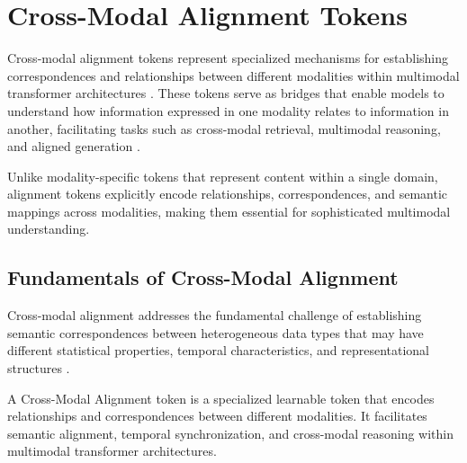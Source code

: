 
\section{Cross-Modal Alignment Tokens}

Cross-modal alignment tokens represent specialized mechanisms for establishing correspondences and relationships between different modalities within multimodal transformer architectures \citep{radford2021learning, li2022blip}. These tokens serve as bridges that enable models to understand how information expressed in one modality relates to information in another, facilitating tasks such as cross-modal retrieval, multimodal reasoning, and aligned generation \citep{li2023blip2, girdhar2023imagebind}.
\begin{comment}
Feedback: This is a good definition. To make it more intuitive, you could use an analogy: "If modality-specific tokens ([IMG], [AUDIO]) are like nouns representing 'what' is in the input, alignment tokens are like verbs and prepositions, representing the relationships 'between' them. They learn to answer questions like 'Is this sound *coming from* that object?' or 'Does this text *describe* that image?'"
\end{comment}

Unlike modality-specific tokens that represent content within a single domain, alignment tokens explicitly encode relationships, correspondences, and semantic mappings across modalities, making them essential for sophisticated multimodal understanding.

\subsection{Fundamentals of Cross-Modal Alignment}

Cross-modal alignment addresses the fundamental challenge of establishing semantic correspondences between heterogeneous data types that may have different statistical properties, temporal characteristics, and representational structures \citep{chen2020simple, wang2022ofa}.

\begin{definition}
A Cross-Modal Alignment token is a specialized learnable token that encodes relationships and correspondences between different modalities. It facilitates semantic alignment, temporal synchronization, and cross-modal reasoning within multimodal transformer architectures.
\end{definition}

